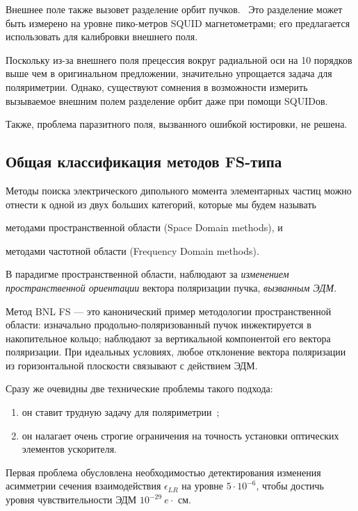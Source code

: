 Внешнее поле также вызовет разделение орбит
пучков.~\cite[стр.~1963]{Koop:SpinWheel} Это разделение может быть
измерено на уровне пико-метров SQUID магнетометрами; его предлагается
использовать для калибровки внешнего поля.

Поскольку из-за внешнего поля прецессия вокруг радиальной оси на 10
порядков выше чем в оригинальном предложении, значительно упрощается
задача для поляриметрии. Однако, существуют сомнения в возможности
измерить вызываемое внешним полем разделение орбит даже при помощи SQUIDов.

Также, проблема паразитного поля, вызванного ошибкой юстировки, не решена.

\subsection{Общая классификация методов FS-типа}
Методы поиска электрического дипольного момента элементарных частиц можно отнести к одной из 
двух больших категорий, которые мы будем называть 
\begin{enumerate*}
	\item методами пространственной области (Space Domain methods), и
	\item методами частотной области (Frequency Domain methods).
\end{enumerate*}

В парадигме пространственной области, наблюдают за \emph{изменением пространственной
ориентации} вектора поляризации пучка, \emph{вызванным ЭДМ}. 

Метод BNL FS --- это канонический пример методологии пространственной области: изначально
продольно-поляризованный пучок инжектируется в накопительное кольцо; наблюдают за 
вертикальной компонентой его вектора поляризации. При идеальных условиях, любое отклонение
вектора поляризации из горизонтальной плоскости связывают с действием ЭДМ.

Сразу же очевидны две технические проблемы такого подхода:
\begin{enumerate}
	\item он ставит трудную задачу для поляриметрии~\cite{Mane:SpinWheel};
	\item он налагает очень строгие ограничения на точность установки оптических элементов ускорителя.
\end{enumerate}

Первая проблема обусловлена необходимостью детектирования изменения асимметрии сечения 
взаимодействия $\epsilon_{LR}$ на уровне $5\cdot 10^{-6}$, чтобы достичь уровня чувствительности
ЭДМ $10^{-29}~e\cdot$ см.~\cite[стр.~18]{BNL:Deuteron2008}

